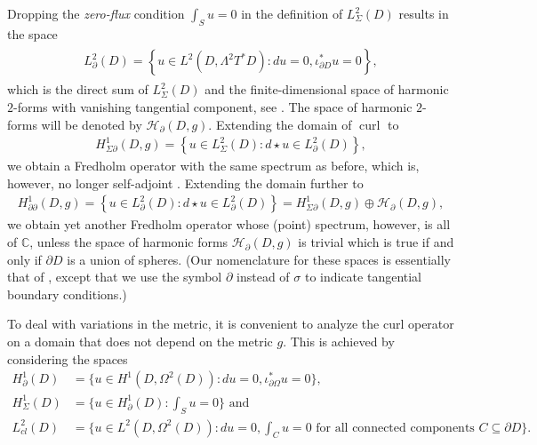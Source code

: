 \documentclass[11pt,reqno]{amsart}
\DeclareMathOperator{\curl}{curl}
\newcommand{\hodge}{\!\star\!}
\begin{document}
Dropping the \emph{zero-flux} condition $\int_S u = 0$ in the definition of $L^2_\Sigma (D)$ results in the space
\begin{align*}
    \begin{split}
    L^2_\partial(D) = \left\{u \in L^2(D,\Lambda^2 T^\ast D): du = 0, \iota_{\partial D}^\ast u = 0 \right\},
    \end{split}
\end{align*}
which is the direct sum of $L^2_\Sigma(D)$ and the finite-dimensional space of harmonic $2$-forms with vanishing tangential component, see \cite[Corollary 2.6.2]{Schwarz1995}. The space of harmonic $2$-forms will be denoted by $\mathcal H_\partial(D,g)$. Extending the domain of $\curl$ to 
\begin{align*}
    H^1_{\Sigma\partial}(D,g) = \left\{u \in L^2_\Sigma(D): d \hodge u \in L^2_\partial(D) \right\},
\end{align*}
we obtain a Fredholm operator with the same spectrum as before, which is, however, no longer self-adjoint \cite[Remark 2]{GigaYoshida1990}. Extending the domain further to 
\begin{align*}
    H^1_{\partial\partial}(D,g) = \left\{u \in L^2_\partial(D): d \hodge u \in L^2_\partial(D) \right\} = H^1_{\Sigma\partial}(D,g) \oplus \mathcal H_\partial(D,g),
\end{align*}
we obtain yet another Fredholm operator whose (point) spectrum, however, is all of $\mathbb C$, unless the space of harmonic forms $\mathcal H_\partial(D,g)$ is trivial \cite[Theorem 2]{GigaYoshida1990} which is true if and only if $\partial D$ is a union of spheres. (Our nomenclature for these spaces is essentially that of \cite{GigaYoshida1990}, except that we use the symbol $\partial$ instead of $\sigma$ to indicate tangential boundary conditions.)

To deal with variations in the metric, it is convenient to analyze the curl operator on a domain that does not depend on the metric $g$. This is achieved by considering the spaces 
\begin{align*}
    H^1_\partial(D) &= \{u \in H^1(D,\Omega^2(D)): du = 0, \iota_{\partial \Omega}^\ast u = 0\}, \\
    H^1_\Sigma(D) &= \{u \in H^1_\partial(D): \textstyle\int_S u = 0\} \text{ and } \\
    L^2_{cl}(D) &= \{u \in L^2(D,\Omega^2(D)): du = 0, \textstyle\int_{C} u = 0 \text{ for all connected components } C \subseteq \partial D\}.
\end{align*}
\end{document}
